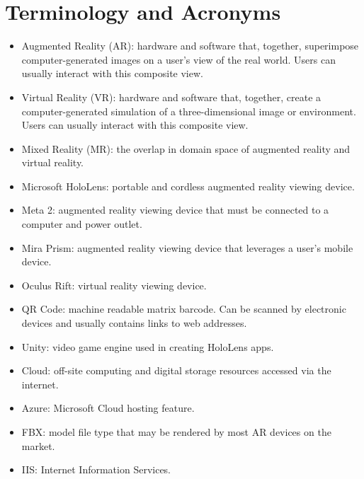 \section{Terminology and Acronyms}

\begin{itemize}
	\item Augmented Reality (AR): hardware and software that, together, superimpose computer-generated images on a user's view of the real world. Users can usually interact with this composite view.

	\item Virtual Reality (VR): hardware and software that, together, create a computer-generated simulation of a three-dimensional image or environment. Users can usually interact with this composite view.

	\item Mixed Reality (MR): the overlap in domain space of augmented reality and virtual reality. 

	\item Microsoft HoloLens: portable and cordless augmented reality viewing device. 

	\item Meta 2: augmented reality viewing device that must be connected to a computer and power outlet. 

	\item Mira Prism: augmented reality viewing device that leverages a user's mobile device.

	\item Oculus Rift: virtual reality viewing device. 

    \item QR Code: machine readable matrix barcode. Can be scanned by electronic devices and usually contains links to web addresses.
    
    \item Unity: video game engine used in creating HoloLens apps.

	\item Cloud: off-site computing and digital storage resources accessed via the internet. 

    \item Azure: Microsoft Cloud hosting feature.

	\item FBX: model file type that may be rendered by most AR devices on the market. 

	\item IIS: Internet Information Services.
\end{itemize}


